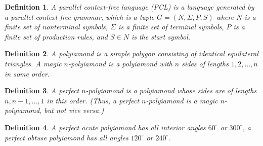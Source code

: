 \documentclass[a4paper,12pt]{article}
\newtheorem{definition}{\bf Definition}[section]
\begin{document}
\begin{definition}
A {\em parallel context-free language (PCL)}\cite{Siromoney1974} is a 
language generated by a parallel context-free grammar, which is a tuple 
$G = (N, \Sigma, P, S)$ where $N$ is a finite set of nonterminal symbols, 
$\Sigma$ is a finite set of terminal symbols, $P$ is a finite set of 
production rules, and $S \in N$ is the start symbol.
\end{definition}







\begin{definition}
A {\em polyiamond} is a simple polygon consisting of 
identical equilateral triangles.
A {\em magic $n$-polyiamond} is a polyiamond with $n$ sides of lengths
$1,2,\ldots,n$ in some order.
\end{definition}


\begin{definition}
A {\em perfect $n$-polyiamond}\cite{APSITIS1} is a polyiamond whose 
sides are of lengths $n,n-1,\ldots,1$ in this order. 
(Thus, a perfect $n$-polyiamond is a magic $n$-polyiamond, but not
vice versa.)
\end{definition}

\begin{definition}
A {\em perfect acute polyiamond} has all interior angles 
$60^{\circ}$ or $300^{\circ}$, a {\em perfect obtuse polyiamond} 
has all angles $120^{\circ}$ or $240^{\circ}$.
\end{definition}


\begin{center}
\end{center}
\end{document}

